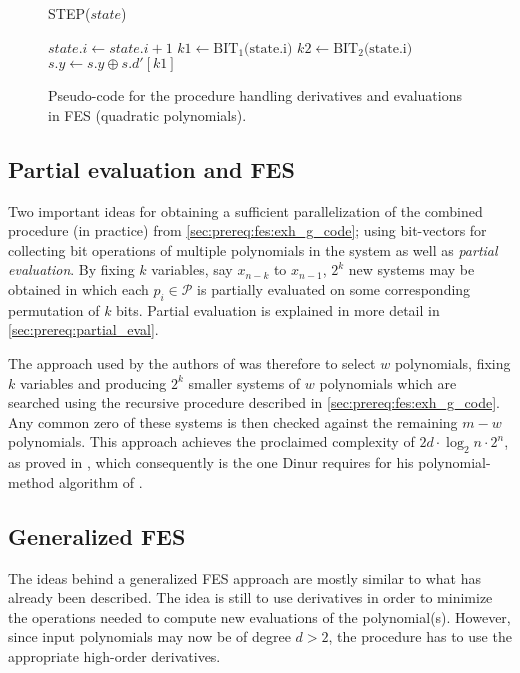\begin{figure}[t]
    \begin{alg}
        \caption{STEP($state$)} \label{alg:fes_step}
        $state.i \gets state.i + 1$\;
        $k1 \gets \text{BIT}_1\text{(state.i)}$\;
        $k2 \gets \text{BIT}_2\text{(state.i)}$\;
        $s.y \gets s.y \oplus s.d'[k1]$\;
    \end{alg}
    \caption{Pseudo-code for the procedure handling derivatives and evaluations in FES (quadratic polynomials).}
\end{figure}

\subsection{Partial evaluation and FES}

Two important ideas for obtaining a sufficient parallelization of the combined procedure (in practice) from \cref{sec:prereq:fes:exh_g_code}; using bit-vectors for collecting bit operations of multiple polynomials in the system as well as \textit{partial evaluation}. By fixing $k$ variables, say $x_{n-k}$ to $x_{n-1}$, $2^k$ new systems may be obtained in which each $p_i \in \mathcal{P}$ is partially evaluated on some corresponding permutation of $k$ bits. Partial evaluation is explained in more detail in \cref{sec:prereq:partial_eval}.

The approach used by the authors of \cite{ches-2010-23990, cryptoeprint:2013/436} was therefore to select $w$ polynomials, fixing $k$ variables and producing $2^k$ smaller systems of $w$ polynomials which are searched using the recursive procedure described in \cref{sec:prereq:fes:exh_g_code}. Any common zero of these systems is then checked against the remaining $m-w$ polynomials. This approach achieves the proclaimed complexity of $2d\cdot\log_2 n \cdot 2^n$, as proved in \cite{ches-2010-23990}, which consequently is the one Dinur requires for his polynomial-method algorithm of \cite{eurocrypt-2021-30841}.

\subsection{Generalized FES} \label{sec:ext:fes_interp:g_fes}
The ideas behind a generalized FES approach are mostly similar to what has already been described. The idea is still to use derivatives in order to minimize the operations needed to compute new evaluations of the polynomial(s). However, since input polynomials may now be of degree $d > 2$, the procedure has to use the appropriate high-order derivatives.

